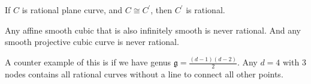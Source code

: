 \begin{lemma*}{
    \label{1.2.1}
    If $C$ is rational plane curve, and $C\cong C^{'}$, then $C^{'}$ is rational.
}
\end{lemma*}
\begin{lemma*}{
    Any affine smooth cubic that is also infinitely smooth is never rational. And any smooth projective cubic curve is never rational.
}
\end{lemma*}

A counter example of this is if we have genus $\mathfrak{g} = \frac{(d-1)(d-2)}{2}$.
Any $d = 4$ with 3 nodes contains all rational curves without a line to connect all other points.

